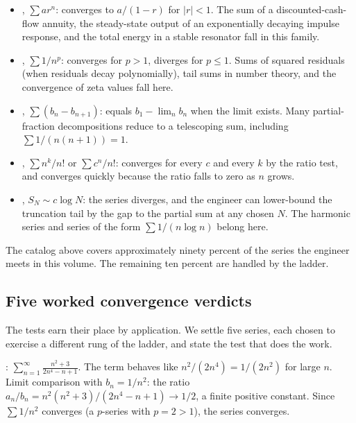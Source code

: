 \begin{itemize}[leftmargin=*]
  \item {}, $\sum a r^{n}$: converges to
    $a/(1 - r)$ for $|r| < 1$. The sum of a discounted-cash-flow
    annuity, the steady-state output of an exponentially decaying
    impulse response, and the total energy in a stable resonator
    fall in this family.
  \item {}, $\sum 1/n^{p}$: converges for
    $p > 1$, diverges for $p \leq 1$. Sums of squared residuals
    (when residuals decay polynomially), tail sums in number theory,
    and the convergence of zeta values fall here.
  \item {}, $\sum (b_{n} - b_{n+1})$: equals
    $b_{1} - \lim_{n} b_{n}$ when the limit exists. Many partial-
    fraction decompositions reduce to a telescoping sum, including
    $\sum 1/(n(n+1)) = 1$.
  \item {}, $\sum n^{k}/n!$ or
    $\sum c^{n}/n!$: converges for every $c$ and every $k$ by the
    ratio test, and converges quickly because the ratio falls to
    zero as $n$ grows.
  \item {}, $S_{N} \sim c \log N$: the
    series diverges, and the engineer can lower-bound the truncation
    tail by the gap to the partial sum at any chosen $N$. The
    harmonic series and series of the form $\sum 1/(n \log n)$
    belong here.
\end{itemize}

The catalog above covers approximately ninety percent of the series
the engineer meets in this volume. The remaining ten percent are
handled by the ladder.

\subsection{Five worked convergence verdicts}

The tests earn their place by application. We settle five series, each
chosen to exercise a different rung of the ladder, and state the test
that does the work.

: $\displaystyle \sum_{n=1}^{\infty}
\frac{n^{2} + 3}{2 n^{4} - n + 1}$. The term behaves like $n^{2}/(2
n^{4}) = 1/(2 n^{2})$ for large $n$. Limit comparison with $b_{n} =
1/n^{2}$: the ratio $a_{n}/b_{n} = n^{2}(n^{2} + 3)/(2 n^{4} - n + 1)
\to 1/2$, a finite positive constant. Since $\sum 1/n^{2}$ converges
(a $p$-series with $p = 2 > 1$), the series converges.

